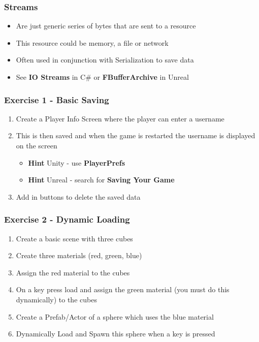 \begin{frame}
	\frametitle{Streams}
  \begin{itemize}
    \item Are just generic series of bytes that are sent to a resource
    \item This resource could be memory, a file or network
    \item Often used in conjunction with Serialization to save data
    \item See \textbf{IO Streams} in C\# or \textbf{FBufferArchive} in Unreal
  \end{itemize}
\end{frame}

\begin{frame}
	\frametitle{Exercise 1 - Basic Saving}
	\begin{enumerate}
		\item Create a Player Info Screen where the player can enter a username
		\item This is then saved and when the game is restarted the username is displayed on the screen
		\begin{itemize}
		\item \textbf{Hint} Unity - use \textbf{PlayerPrefs} 
		\item \textbf{Hint} Unreal - search for \textbf{Saving Your Game}
		\end{itemize}
		\item Add in buttons to delete the saved data
	\end{enumerate}
\end{frame}

\begin{frame}
	\frametitle{Exercise 2 - Dynamic Loading}
	\begin{enumerate}
		\item Create a basic scene with three cubes
		\item Create three materials (red, green, blue)
		\item Assign the red material to the cubes
		\item On a key press load and assign the green material (you must do this dynamically) to the cubes
		\item Create a Prefab/Actor of a sphere which uses the blue material
		\item Dynamically Load and Spawn this sphere when a key is pressed 
	\end{enumerate}
\end{frame}


